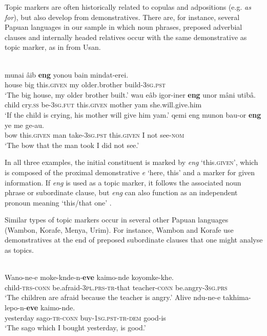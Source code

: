 \documentclass[output=paper,colorlinks,citecolor=brown]{langscibook}
\begin{document}
Topic markers are often historically related to copulas and adpositions (e.g. \textit{as} \textit{for}), but also develop from demonstratives. There are, for instance, several Papuan languages in our sample in which noun phrases, preposed adverbial clauses and internally headed relatives occur with the same demonstrative as topic marker, as in  from Usan.

\ea\label{ex:diessel:46}
\\
\ea \gll   {\ob}munai  âib \textbf{eng}{\cb}    yonou  bain     mindat-erei.\\
       {\db}house  big this.\textsc{given}  my  older.brother   build-3\textsc{sg.pst}\\
\glt   ‘The big house, my older brother built.’
\ex
\gll {\ob}wau   eâb   igor-iner  \textbf{eng}{\cb}   unor   mâni   utibâ.\\
    {\db}child   cry.\textsc{ss}   be-\textsc{3sg.fut}  this.\textsc{given} mother yam she.will.give.him\\
\glt   ‘If the child is crying, his mother will give him yam.’
\ex
\gll   {\ob}qemi  eng  munon   bau-or   \textbf{eng}{\cb}  ye   me   ge-au.\\
       {\db}bow  this.\textsc{given}  man   take-\textsc{3sg.pst}  this.\textsc{given}  I   not   see-\textsc{nom}  \\
\glt   ‘The bow that the man took I did not see.’
\z
\z

In all three examples, the initial constituent is marked by \textit{eng} ‘this.\textsc{given’,} which is composed of the proximal demonstrative \textit{e} ‘here, this’ and a marker for given information. If \textit{eng} is used as a topic marker, it follows the associated noun phrase or subordinate clause, but \textit{eng} can also function as an independent pronoun meaning ‘this/that one’ \citep[209]{Himmelmann1997}.

Similar types of topic markers occur in several other Papuan languages (Wambon, Korafe, Menya, Urim). For instance, Wambon  and Korafe  use demonstratives at the end of preposed subordinate clauses that one might analyse as topics.

\ea\label{ex:diessel:47}
\\
\ea \gll   {\ob}Wano-ne-e  moke-knde-n-\textbf{eve}{\cb}  kaimo-nde  koyomke-khe.  \\
       {\db}child-\textsc{trs-conn}  be.afraid-3\textsc{pl.prs-tr}-that  teacher\textsc{-conn}  be.angry\textsc{-3sg.prs}\\
\glt   ‘The children are afraid because the teacher is angry.’
\ex
\gll   {\ob}Alive   ndu-ne-e  takhima-lepo-n-\textbf{eve}{\cb}  kaimo-nde.\\
{\db}yesterday sago-\textsc{tr-conn}  {buy}\textsc{-1sg.pst-tr}-\textsc{dem} {good-is}\\
\glt   ‘The sago which I bought yesterday, is good.’
\z
\z
\end{document}
